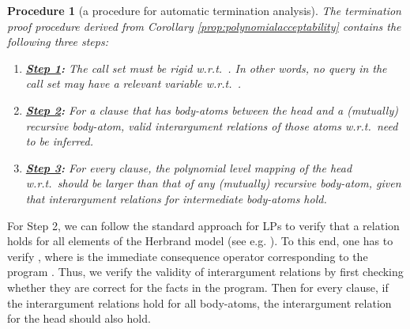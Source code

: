 \documentclass[envcountsame]{tlp}
\newcounter{ex:der-lastsymconsctr}
\newtheorem{procedure}{Procedure}
\begin{document}
\begin{procedure}[a procedure for automatic termination analysis]
The termination proof procedure derived from Corollary \ref{prop:polynomialacceptability}
contains the following three steps:
	\label{proof_procedure}
	\begin{enumerate}
		\item[] \textbf{\underline{Step 1}:} The call set  must
be rigid w.r.t.\ .  In other words, no query  in the call set may have a relevant
variable w.r.t.\ . 
\item[] \textbf{\underline{Step 2}:} For a clause that has 
body-atoms between the head and a (mutually) recursive body-atom,  valid interargument
relations of those atoms w.r.t.\  need to be inferred. 
\item[] \textbf{\underline{Step 3}:} For every clause, the polynomial level
mapping of the head w.r.t.\  should be larger than that of any (mutually) recursive
body-atom, given that interargument relations for intermediate body-atoms hold.  
	\end{enumerate}
\end{procedure}

For Step 2, we can follow the standard approach for LPs to verify that a
relation 
holds for all elements
of the Herbrand model (see e.g. \cite{Lloyd87}). To this end, 
one has to verify , where
 is the immediate consequence operator corresponding to the program .
Thus, we verify the validity of interargument
relations by first checking whether they are correct for the facts in the program. Then for every
clause, if the interargument relations hold for all body-atoms, the
interargument
relation for the head
should also hold.
\end{document}
